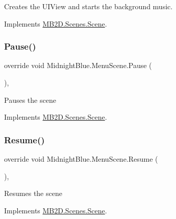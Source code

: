 Creates the U\+I\+View and starts the background music. 



Implements \hyperlink{class_m_b2_d_1_1_scenes_1_1_scene_a081b4f8866936b495bdce388a7c96c25}{M\+B2\+D.\+Scenes.\+Scene}.

\hypertarget{class_midnight_blue_1_1_menu_scene_a7a2f8875f949d2ec2e6f3a8c6da7cedf}{}\label{class_midnight_blue_1_1_menu_scene_a7a2f8875f949d2ec2e6f3a8c6da7cedf} 
\subsubsection{\texorpdfstring{Pause()}{Pause()}}
{\footnotesize\ttfamily override void Midnight\+Blue.\+Menu\+Scene.\+Pause (\begin{DoxyParamCaption}{ }\end{DoxyParamCaption})\hspace{0.3cm}{\ttfamily [inline]}, {\ttfamily [virtual]}}



Pauses the scene 



Implements \hyperlink{class_m_b2_d_1_1_scenes_1_1_scene_a0661eff0223150fa8e9ea88145409e5d}{M\+B2\+D.\+Scenes.\+Scene}.

\hypertarget{class_midnight_blue_1_1_menu_scene_a76f8bd3add4abf16ac9962a2fb51fad2}{}\label{class_midnight_blue_1_1_menu_scene_a76f8bd3add4abf16ac9962a2fb51fad2} 
\subsubsection{\texorpdfstring{Resume()}{Resume()}}
{\footnotesize\ttfamily override void Midnight\+Blue.\+Menu\+Scene.\+Resume (\begin{DoxyParamCaption}{ }\end{DoxyParamCaption})\hspace{0.3cm}{\ttfamily [inline]}, {\ttfamily [virtual]}}



Resumes the scene 



Implements \hyperlink{class_m_b2_d_1_1_scenes_1_1_scene_ad13639db22b059a1b714eefd9d927735}{M\+B2\+D.\+Scenes.\+Scene}.

